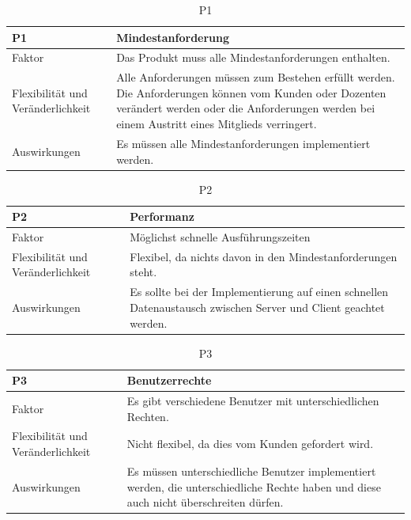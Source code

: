 \documentclass[fontsize=12pt,paper=a4,twoside]{scrartcl}
\begin{document}
\begin{table}[H]
\caption{P1}
\begin{tabular}{|p{3cm}|p{12cm}|}\hline
\textbf{P1} & \textbf{Mindestanforderung} \\ \hline \hline
Faktor & Das Produkt muss alle Mindestanforderungen enthalten.\\ \hline
Flexibilität und Veränderlichkeit & Alle Anforderungen müssen zum Bestehen erfüllt werden. Die Anforderungen können vom Kunden oder Dozenten verändert werden oder die Anforderungen werden bei einem Austritt eines Mitglieds verringert.\\ \hline
Auswirkungen & Es müssen alle Mindestanforderungen implementiert werden. \\ \hline
\end{tabular}
\end{table}

\begin{table}[H]
\caption{P2}
\begin{tabular}{|p{3cm}|p{12cm}|}\hline
\textbf{P2} &  \textbf{Performanz}\\ \hline \hline
Faktor & Möglichst schnelle Ausführungszeiten\\ \hline
Flexibilität und Veränderlichkeit & Flexibel, da nichts davon in den Mindestanforderungen steht.\\ \hline
Auswirkungen & Es sollte bei der Implementierung auf einen schnellen Datenaustausch zwischen Server und Client geachtet werden. \\ \hline
\end{tabular}
\end{table}

\begin{table}[H]
\caption{P3}
\begin{tabular}{|p{3cm}|p{12cm}|}\hline
\textbf{P3} &  \textbf{Benutzerrechte} \\ \hline \hline
Faktor & Es gibt verschiedene Benutzer mit unterschiedlichen Rechten.\\ \hline
Flexibilität und Veränderlichkeit & Nicht flexibel, da dies vom Kunden gefordert wird.\\ \hline
Auswirkungen & Es müssen unterschiedliche Benutzer implementiert werden, die unterschiedliche Rechte haben und diese auch nicht überschreiten dürfen. \\ \hline
\end{tabular}
\end{table}
\end{document}
